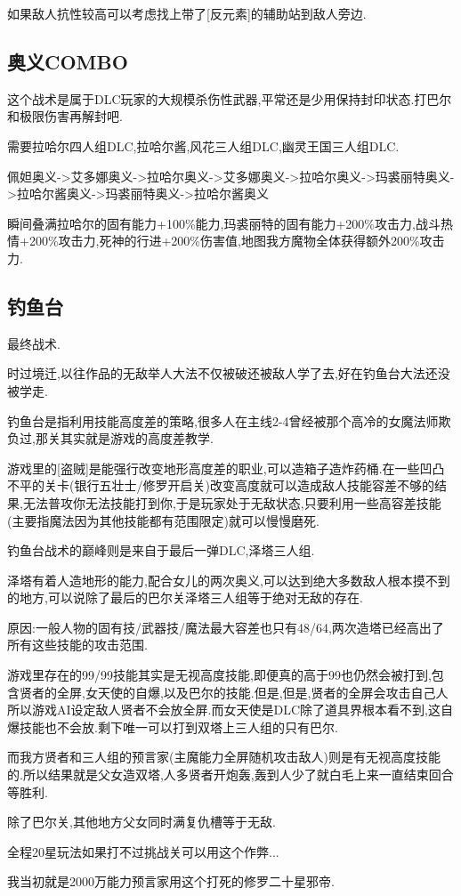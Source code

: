 	如果敌人抗性较高可以考虑找上带了[反元素]的辅助站到敌人旁边.

	\subsection{奥义COMBO}

	这个战术是属于DLC玩家的大规模杀伤性武器,平常还是少用保持封印状态.打巴尔和极限伤害再解封吧.

	需要拉哈尔四人组DLC,拉哈尔酱,风花三人组DLC,幽灵王国三人组DLC.

	佩妲奥义->艾多娜奥义->拉哈尔奥义->艾多娜奥义->拉哈尔奥义->玛裘丽特奥义->拉哈尔酱奥义->玛裘丽特奥义->拉哈尔酱奥义

	瞬间叠满拉哈尔的固有能力+100\%能力,玛裘丽特的固有能力+200\%攻击力,战斗热情+200\%攻击力,死神的行进+200\%伤害值,地图我方魔物全体获得额外200\%攻击力.

	\newpage
	
	\subsection{钓鱼台}

	最终战术.

	时过境迁,以往作品的无敌举人大法不仅被破还被敌人学了去,好在钓鱼台大法还没被学走.

	钓鱼台是指利用技能高度差的策略,很多人在主线2-4曾经被那个高冷的女魔法师欺负过,那关其实就是游戏的高度差教学.

	游戏里的[盗贼]是能强行改变地形高度差的职业,可以造箱子造炸药桶.在一些凹凸不平的关卡(银行五壮士/修罗开启关)改变高度就可以造成敌人技能容差不够的结果,无法普攻你无法技能打到你,于是玩家处于无敌状态,只要利用一些高容差技能(主要指魔法因为其他技能都有范围限定)就可以慢慢磨死.

	钓鱼台战术的巅峰则是来自于最后一弹DLC,泽塔三人组.

	泽塔有着人造地形的能力,配合女儿的两次奥义,可以达到绝大多数敌人根本摸不到的地方,可以说除了最后的巴尔关泽塔三人组等于绝对无敌的存在.

	原因:一般人物的固有技/武器技/魔法最大容差也只有48/64,两次造塔已经高出了所有这些技能的攻击范围.

	游戏里存在的99/99技能其实是无视高度技能,即便真的高于99也仍然会被打到,包含贤者的全屏,女天使的自爆,以及巴尔的技能.但是,但是,贤者的全屏会攻击自己人所以游戏AI设定敌人贤者不会放全屏.而女天使是DLC除了道具界根本看不到,这自爆技能也不会放.剩下唯一可以打到双塔上三人组的只有巴尔.

	而我方贤者和三人组的预言家(主魔能力全屏随机攻击敌人)则是有无视高度技能的.所以结果就是父女造双塔,人多贤者开炮轰,轰到人少了就白毛上来一直结束回合等胜利.

	除了巴尔关,其他地方父女同时满复仇槽等于无敌.

	全程20星玩法如果打不过挑战关可以用这个作弊...

	我当初就是2000万能力预言家用这个打死的修罗二十星邪帝.
